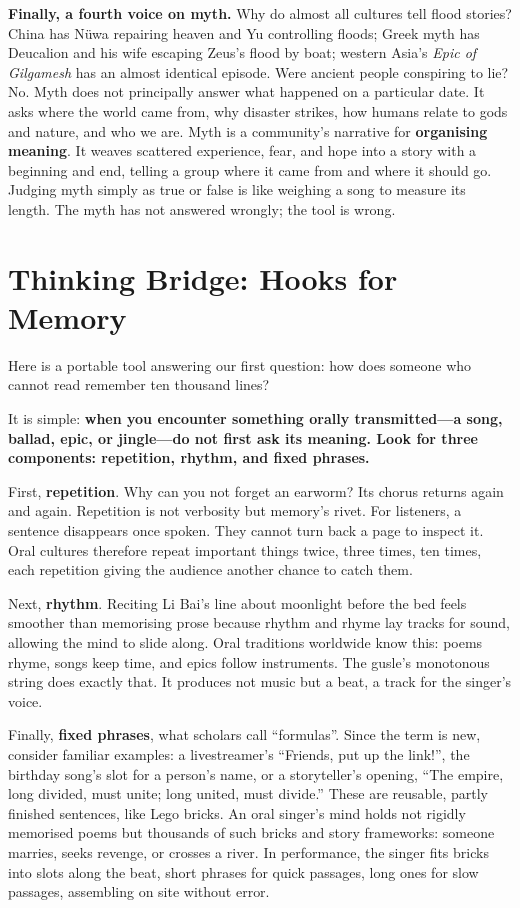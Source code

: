 \textbf{Finally, a fourth voice on myth.} Why do almost all cultures tell flood stories? China has Nüwa repairing heaven and Yu controlling floods; Greek myth has Deucalion and his wife escaping Zeus's flood by boat; western Asia's \emph{Epic of Gilgamesh} has an almost identical episode. Were ancient people conspiring to lie? No. Myth does not principally answer what happened on a particular date. It asks where the world came from, why disaster strikes, how humans relate to gods and nature, and who we are. Myth is a community's narrative for \textbf{organising meaning}. It weaves scattered experience, fear, and hope into a story with a beginning and end, telling a group where it came from and where it should go. Judging myth simply as true or false is like weighing a song to measure its length. The myth has not answered wrongly; the tool is wrong.

\section{Thinking Bridge: Hooks for Memory}
Here is a portable tool answering our first question: how does someone who cannot read remember ten thousand lines?

It is simple: \textbf{when you encounter something orally transmitted---a song, ballad, epic, or jingle---do not first ask its meaning. Look for three components: repetition, rhythm, and fixed phrases.}

First, \textbf{repetition}. Why can you not forget an earworm? Its chorus returns again and again. Repetition is not verbosity but memory's rivet. For listeners, a sentence disappears once spoken. They cannot turn back a page to inspect it. Oral cultures therefore repeat important things twice, three times, ten times, each repetition giving the audience another chance to catch them.

Next, \textbf{rhythm}. Reciting Li Bai's line about moonlight before the bed feels smoother than memorising prose because rhythm and rhyme lay tracks for sound, allowing the mind to slide along. Oral traditions worldwide know this: poems rhyme, songs keep time, and epics follow instruments. The gusle's monotonous string does exactly that. It produces not music but a beat, a track for the singer's voice.

Finally, \textbf{fixed phrases}, what scholars call ``formulas''. Since the term is new, consider familiar examples: a livestreamer's ``Friends, put up the link!'', the birthday song's slot for a person's name, or a storyteller's opening, ``The empire, long divided, must unite; long united, must divide.'' These are reusable, partly finished sentences, like Lego bricks. An oral singer's mind holds not rigidly memorised poems but thousands of such bricks and story frameworks: someone marries, seeks revenge, or crosses a river. In performance, the singer fits bricks into slots along the beat, short phrases for quick passages, long ones for slow passages, assembling on site without error.

